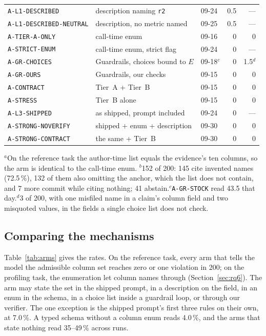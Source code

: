 \documentclass[10pt,twocolumn]{article}
\begin{document}
\begin{table}[!htbp]
{\begin{tabular}{@{}lllrr@{}}
\texttt{A-L1-DESCRIBED}      & description naming \texttt{r2} & 09-24 & 0.5 & --- \\
\texttt{A-L1-DESCRIBED-NEUTRAL} & description, no metric named & 09-25 & 0.5 & --- \\
\texttt{A-TIER-A-ONLY}       & call-time enum             & 09-16 & 0 & 0 \\
\texttt{A-STRICT-ENUM}       & call-time enum, strict flag & 09-24 & 0 & --- \\
\texttt{A-GR-CHOICES}        & Guardrails, choices bound to $E$ & 09-18$^{c}$ & 0 & 1.5$^{d}$ \\
\midrule
\texttt{A-GR-OURS}           & Guardrails, our checks     & 09-15 & 0 & 0 \\
\texttt{A-CONTRACT}          & Tier~A + Tier~B            & 09-15 & 0 & 0 \\
\texttt{A-STRESS}            & Tier~B alone               & 09-15 & 0 & 0 \\
\texttt{A-L3-SHIPPED}        & as shipped, prompt included & 09-24 & 0 & --- \\
\midrule
\texttt{A-STRONG-NOVERIFY}   & shipped + enum + description & 09-30 & 0 & 0 \\
\texttt{A-STRONG-CONTRACT}   & the same + Tier~B          & 09-30 & 0 & 0 \\
\bottomrule
\end{tabular}}

\vspace{2pt}
{\footnotesize $^{a}$On the reference task the author-time list equals the
evidence's ten columns, so the arm is identical to the call-time enum.\quad
$^{b}$152 of 200: 145 cite invented names (72.5\,\%), 132 of them also
omitting the anchor, which the list does not contain, and 7 more commit while
citing nothing; 41 abstain.\quad $^{c}$\texttt{A-GR-STOCK} read
43.5 that day.\quad $^{d}$3 of 200, with one misfiled name in a claim's column
field and two misquoted values, in the fields a single choice list does not
check.}
\end{table}

\subsection{Comparing the mechanisms}

Table~\ref{tab:arms} gives the rates. On the reference task, every arm that
tells the model the admissible column set reaches zero or one violation in 200;
on the profiling task, the enumeration let column names through
(Section~\ref{sec:rq6}). The arm
may state the set in the shipped prompt, in a description on the field, in an
enum in the schema, in a choice list inside a guardrail loop, or through our
verifier. The one exception is the shipped prompt's first three rules on their
own, at 7.0\,\%. A typed schema without a column enum reads 4.0\,\%, and the
arms that state nothing read 35--49\,\% across runs.
\end{document}
